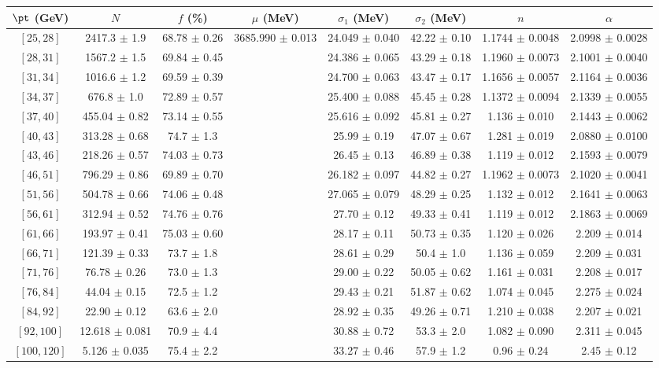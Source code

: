 \begin{tabular}{c||c|c|c|c|c|c|c}
$\pt$ (GeV) & $N$ & $f$ (\%) & $\mu$ (MeV) & $\sigma_1$ (MeV) & $\sigma_2$ (MeV) & $n$ & $\alpha$ \\
\hline
$[25, 28]$ & 2417.3 $\pm$ 1.9 & 68.78 $\pm$ 0.26 & \multirow{17}{*}{3685.990 $\pm$ 0.013} & 24.049 $\pm$ 0.040 & 42.22 $\pm$ 0.10 & 1.1744 $\pm$ 0.0048 & 2.0998 $\pm$ 0.0028\\
$[28, 31]$ & 1567.2 $\pm$ 1.5 & 69.84 $\pm$ 0.45 &  & 24.386 $\pm$ 0.065 & 43.29 $\pm$ 0.18 & 1.1960 $\pm$ 0.0073 & 2.1001 $\pm$ 0.0040\\
$[31, 34]$ & 1016.6 $\pm$ 1.2 & 69.59 $\pm$ 0.39 &  & 24.700 $\pm$ 0.063 & 43.47 $\pm$ 0.17 & 1.1656 $\pm$ 0.0057 & 2.1164 $\pm$ 0.0036\\
$[34, 37]$ & 676.8 $\pm$ 1.0 & 72.89 $\pm$ 0.57 &  & 25.400 $\pm$ 0.088 & 45.45 $\pm$ 0.28 & 1.1372 $\pm$ 0.0094 & 2.1339 $\pm$ 0.0055\\
$[37, 40]$ & 455.04 $\pm$ 0.82 & 73.14 $\pm$ 0.55 &  & 25.616 $\pm$ 0.092 & 45.81 $\pm$ 0.27 & 1.136 $\pm$ 0.010 & 2.1443 $\pm$ 0.0062\\
$[40, 43]$ & 313.28 $\pm$ 0.68 & 74.7 $\pm$ 1.3 &  & 25.99 $\pm$ 0.19 & 47.07 $\pm$ 0.67 & 1.281 $\pm$ 0.019 & 2.0880 $\pm$ 0.0100\\
$[43, 46]$ & 218.26 $\pm$ 0.57 & 74.03 $\pm$ 0.73 &  & 26.45 $\pm$ 0.13 & 46.89 $\pm$ 0.38 & 1.119 $\pm$ 0.012 & 2.1593 $\pm$ 0.0079\\
$[46, 51]$ & 796.29 $\pm$ 0.86 & 69.89 $\pm$ 0.70 &  & 26.182 $\pm$ 0.097 & 44.82 $\pm$ 0.27 & 1.1962 $\pm$ 0.0073 & 2.1020 $\pm$ 0.0041\\
$[51, 56]$ & 504.78 $\pm$ 0.66 & 74.06 $\pm$ 0.48 &  & 27.065 $\pm$ 0.079 & 48.29 $\pm$ 0.25 & 1.132 $\pm$ 0.012 & 2.1641 $\pm$ 0.0063\\
$[56, 61]$ & 312.94 $\pm$ 0.52 & 74.76 $\pm$ 0.76 &  & 27.70 $\pm$ 0.12 & 49.33 $\pm$ 0.41 & 1.119 $\pm$ 0.012 & 2.1863 $\pm$ 0.0069\\
$[61, 66]$ & 193.97 $\pm$ 0.41 & 75.03 $\pm$ 0.60 &  & 28.17 $\pm$ 0.11 & 50.73 $\pm$ 0.35 & 1.120 $\pm$ 0.026 & 2.209 $\pm$ 0.014\\
$[66, 71]$ & 121.39 $\pm$ 0.33 & 73.7 $\pm$ 1.8 &  & 28.61 $\pm$ 0.29 & 50.4 $\pm$ 1.0 & 1.136 $\pm$ 0.059 & 2.209 $\pm$ 0.031\\
$[71, 76]$ & 76.78 $\pm$ 0.26 & 73.0 $\pm$ 1.3 &  & 29.00 $\pm$ 0.22 & 50.05 $\pm$ 0.62 & 1.161 $\pm$ 0.031 & 2.208 $\pm$ 0.017\\
$[76, 84]$ & 44.04 $\pm$ 0.15 & 72.5 $\pm$ 1.2 &  & 29.43 $\pm$ 0.21 & 51.87 $\pm$ 0.62 & 1.074 $\pm$ 0.045 & 2.275 $\pm$ 0.024\\
$[84, 92]$ & 22.90 $\pm$ 0.12 & 63.6 $\pm$ 2.0 &  & 28.92 $\pm$ 0.35 & 49.26 $\pm$ 0.71 & 1.210 $\pm$ 0.038 & 2.207 $\pm$ 0.021\\
$[92, 100]$ & 12.618 $\pm$ 0.081 & 70.9 $\pm$ 4.4 &  & 30.88 $\pm$ 0.72 & 53.3 $\pm$ 2.0 & 1.082 $\pm$ 0.090 & 2.311 $\pm$ 0.045\\
$[100, 120]$ & 5.126 $\pm$ 0.035 & 75.4 $\pm$ 2.2 &  & 33.27 $\pm$ 0.46 & 57.9 $\pm$ 1.2 & 0.96 $\pm$ 0.24 & 2.45 $\pm$ 0.12\\
\end{tabular}
